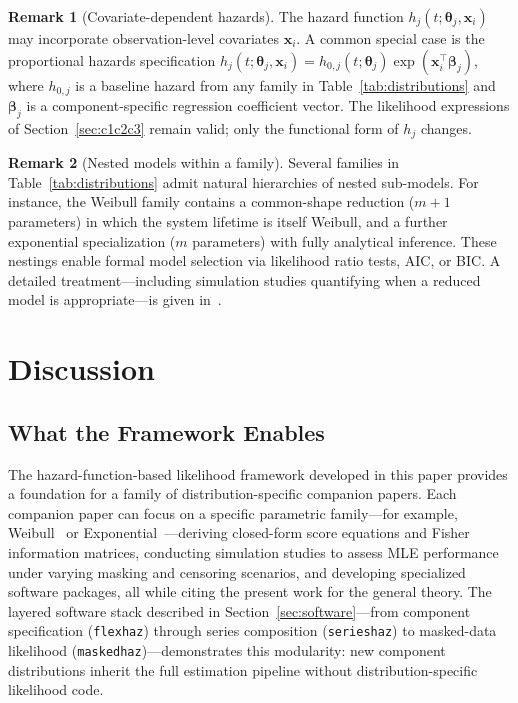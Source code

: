 \documentclass[11pt]{article}
\theoremstyle{definition}
\newtheorem{remark}{Remark}
\theoremstyle{plain}
\renewcommand{\v}[1]{\boldsymbol{#1}}
\begin{document}
\begin{remark}[Covariate-dependent hazards]
\label{rem:covariate-hazards}
The hazard function $h_j(t; \v{\theta}_j, \v{x}_i)$ may incorporate
observation-level covariates $\v{x}_i$. A common special case is the
proportional hazards specification
$h_j(t; \v{\theta}_j, \v{x}_i) = h_{0,j}(t; \v{\theta}_j)
\exp(\v{x}_i^\top \v{\beta}_j)$,
where $h_{0,j}$ is a baseline hazard from any family in
Table~\ref{tab:distributions} and $\v{\beta}_j$ is a
component-specific regression coefficient vector.
The likelihood expressions of Section~\ref{sec:c1c2c3} remain valid;
only the functional form of $h_j$ changes.
\end{remark}

\begin{remark}[Nested models within a family]
\label{rem:nested-models}
Several families in Table~\ref{tab:distributions} admit natural
hierarchies of nested sub-models.
For instance, the Weibull family contains a common-shape reduction
($m + 1$ parameters) in which the system lifetime is itself Weibull,
and a further exponential specialization ($m$ parameters) with fully
analytical inference.
These nestings enable formal model selection via likelihood ratio
tests, AIC, or BIC.
A detailed treatment---including simulation studies quantifying when
a reduced model is appropriate---is given
in~\citet{towell2026model-selection}.
\end{remark}


\section{Discussion}
\label{sec:discussion}

\subsection{What the Framework Enables}
\label{sec:what-enables}

The hazard-function-based likelihood framework developed in this paper
provides a foundation for a family of distribution-specific companion
papers.
Each companion paper can focus on a specific parametric family---for
example, Weibull~\citep{towell2026weibull-series} or
Exponential~\citep{towell2026exponential-series}---deriving
closed-form score equations and Fisher information matrices, conducting
simulation studies to assess MLE performance under varying masking and
censoring scenarios, and developing specialized software packages, all
while citing the present work for the general theory.
The layered software stack described in
Section~\ref{sec:software}---from component specification
(\texttt{flexhaz}) through series composition
(\texttt{serieshaz}) to masked-data likelihood
(\texttt{maskedhaz})---demonstrates this modularity:
new component distributions inherit the full estimation pipeline
without distribution-specific likelihood code.
\end{document}
